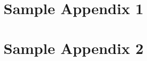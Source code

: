 \documentclass{unimapthesis}
\begin{document}
\mainmatter






\printbibliography[heading=ubibintoc]

\appendix
\chapter{Sample Appendix 1}
\blindtext\blindtext 

\blindtext


\chapter{Sample Appendix 2}
\blindtext

\blindtext\blindtext

\begin{refsection}
\nocite{Lim:2009,Lim:Ranaivo:Tang:Polibits:2011,Lim:Ranaivo:Tang:Procedia:2011}

\printbibliography[heading=listpubintoc]
\end{refsection}
\end{document}
